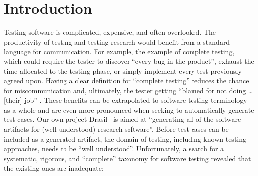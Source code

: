 \section{Introduction}


Testing software is complicated, expensive, and often overlooked. The
productivity of testing and testing research would benefit from a standard
language for communication. For example, \citet[p.~7]{KanerEtAl2011}
 the example of complete testing, which could require the
tester to discover ``every bug in the product'', exhaust the time allocated to
the testing phase, or simply implement every test previously agreed upon.
Having a clear  definition for ``complete testing'' reduces the chance for
miscommunication and, ultimately, the tester getting ``blamed for not
doing \dots{} [their] job'' \citep[p.~7]{KanerEtAl2011}. These benefits can be
extrapolated to software testing terminology as a whole and are even more
pronounced when seeking to automatically generate test cases.
\ifnotpaper Our own project Drasil~\citep{Drasil} is aimed at ``generating all
    of the software artifacts for (well understood) research software''. Before
    test cases can be included as a generated artifact, the domain of testing,
    including known testing approaches, needs to be ``well understood''. \fi
Unfortunately, a search for a systematic, rigorous, and ``complete'' taxonomy
for software testing revealed that the existing ones are inadequate:


